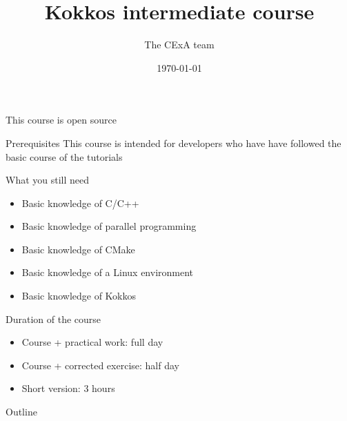 \documentclass[
    aspectratio=169,
    handout,
]{beamer}
\title{Kokkos intermediate course}
\author{The CExA team}
\institute{CEA}
\date{\today}
\begin{document}
\begin{frame}[plain]
    \titlepage
\end{frame}


\begin{frame}{This course is open source}
    \begin{center}
    \end{center}
\end{frame}


\begin{frame}{Prerequisites}
    This course is intended for developers who have have followed the basic course of the tutorials

    \vspace{1em}

    \begin{block}{What you still need}
        \begin{itemize}
            \item Basic knowledge of C/C++
            \item Basic knowledge of parallel programming
            \item Basic knowledge of CMake
            \item Basic knowledge of a Linux environment
            \item Basic knowledge of Kokkos
        \end{itemize}
    \end{block}
\end{frame}


\begin{frame}{Duration of the course}
    \begin{itemize}
        \item Course + practical work: full day
        \item Course + corrected exercise: half day
        \item Short version: 3 hours
    \end{itemize}
\end{frame}

\begin{frame}{Outline}
    \tableofcontents[hidesubsections]
\end{frame}
\end{document}
